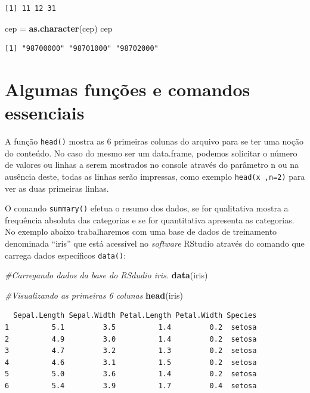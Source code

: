 \documentclass[12pt,brazil,oneside]{book}
\newenvironment{Shaded}{\begin{snugshade}}{\end{snugshade}}
\newcommand{\CommentTok}[1]{\textcolor[rgb]{0.56,0.35,0.01}{\textit{#1}}}
\newcommand{\KeywordTok}[1]{\textcolor[rgb]{0.13,0.29,0.53}{\textbf{#1}}}
\newcommand{\NormalTok}[1]{#1}
\newcommand{\StringTok}[1]{\textcolor[rgb]{0.31,0.60,0.02}{#1}}
\begin{document}
\begin{verbatim}
[1] 11 12 31
\end{verbatim}

\begin{Shaded}
\begin{Highlighting}[]
\NormalTok{cep =}\StringTok{ }\KeywordTok{as.character}\NormalTok{(cep)}
\NormalTok{cep}
\end{Highlighting}
\end{Shaded}

\begin{verbatim}
[1] "98700000" "98701000" "98702000"
\end{verbatim}

\hypertarget{algumas-funcoes-e-comandos-essenciais}{%
\section{Algumas funções e comandos essenciais}\label{algumas-funcoes-e-comandos-essenciais}}

A função \texttt{head()} mostra as 6 primeiras colunas do arquivo para se ter uma noção do conteúdo. No caso do mesmo ser um data.frame, podemos solicitar o número de valores ou linhas a serem mostrados no console através do parâmetro n ou na ausência deste, todas as linhas serão impressas, como exemplo \texttt{head(x\ ,n=2)} para ver as duas primeiras linhas.

O comando \texttt{summary()} efetua o resumo dos dados, se for qualitativa mostra a frequência absoluta das categorias e se for quantitativa apresenta as categorias. No exemplo abaixo trabalharemos com uma base de dados de treinamento denominada ``iris'' que está acessível no \emph{software} RStudio através do comando que carrega dados específicos \texttt{data()}:

\begin{Shaded}
\begin{Highlighting}[]
\CommentTok{#Carregando dados da base do RSdudio iris.}
\KeywordTok{data}\NormalTok{(iris)}

\CommentTok{#Visualizando as primeiras 6 colunas}
\KeywordTok{head}\NormalTok{(iris)}
\end{Highlighting}
\end{Shaded}

\begin{verbatim}
  Sepal.Length Sepal.Width Petal.Length Petal.Width Species
1          5.1         3.5          1.4         0.2  setosa
2          4.9         3.0          1.4         0.2  setosa
3          4.7         3.2          1.3         0.2  setosa
4          4.6         3.1          1.5         0.2  setosa
5          5.0         3.6          1.4         0.2  setosa
6          5.4         3.9          1.7         0.4  setosa
\end{verbatim}
\end{document}
